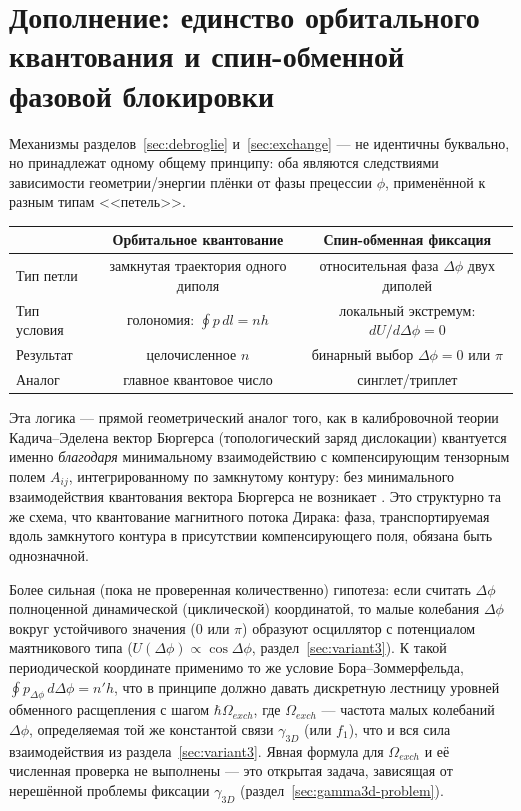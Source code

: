 \documentclass[12pt,a4paper]{article}
\begin{document}
\section{Дополнение: единство орбитального квантования и спин-обменной фазовой блокировки}
\label{sec:unification-quant}

Механизмы разделов~\ref{sec:debroglie} и~\ref{sec:exchange} --- не
идентичны буквально, но принадлежат одному общему принципу: оба являются
следствиями зависимости геометрии/энергии плёнки от фазы прецессии
$\phi$, применённой к разным типам <<петель>>.

\begin{center}
\begin{tabular}{|l|c|c|}
\hline
 & Орбитальное квантование & Спин-обменная фиксация \\
\hline
Тип петли & замкнутая траектория одного диполя & относительная фаза $\Delta\phi$ двух диполей \\
Тип условия & голономия: $\oint p\,dl=nh$ & локальный экстремум: $dU/d\Delta\phi=0$ \\
Результат & целочисленное $n$ & бинарный выбор $\Delta\phi=0$ или $\pi$ \\
Аналог & главное квантовое число & синглет/триплет \\
\hline
\end{tabular}
\end{center}

Эта логика --- прямой геометрический аналог того, как в калибровочной
теории Кадича--Эделена вектор Бюргерса (топологический заряд дислокации)
квантуется именно \emph{благодаря} минимальному взаимодействию с
компенсирующим тензорным полем $A_{ij}$, интегрированному по замкнутому
контуру: без минимального взаимодействия квантования вектора Бюргерса не
возникает \cite{Braginsky2016}. Это структурно та же схема, что
квантование магнитного потока Дирака: фаза, транспортируемая вдоль
замкнутого контура в присутствии компенсирующего поля, обязана быть
однозначной.

Более сильная (пока не проверенная количественно) гипотеза: если считать
$\Delta\phi$ полноценной динамической (циклической) координатой, то малые
колебания $\Delta\phi$ вокруг устойчивого значения ($0$ или $\pi$)
образуют осциллятор с потенциалом маятникового типа
($U(\Delta\phi)\propto\cos\Delta\phi$, раздел~\ref{sec:variant3}). К такой
периодической координате применимо то же условие Бора--Зоммерфельда,
$\oint p_{\Delta\phi}\,d\Delta\phi=n'h$, что в принципе должно давать
дискретную лестницу уровней обменного расщепления с шагом $\hbar\Omega_{exch}$,
где $\Omega_{exch}$ --- частота малых колебаний $\Delta\phi$, определяемая
той же константой связи $\gamma_{3D}$ (или $f_1$), что и вся сила
взаимодействия из раздела~\ref{sec:variant3}. Явная формула для
$\Omega_{exch}$ и её численная проверка не выполнены --- это открытая
задача, зависящая от нерешённой проблемы фиксации $\gamma_{3D}$
(раздел~\ref{sec:gamma3d-problem}).
\end{document}
